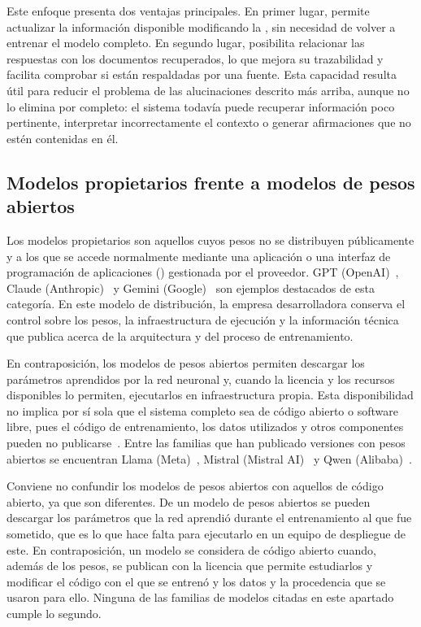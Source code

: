 Este enfoque presenta dos ventajas principales. En primer lugar, permite actualizar la información disponible modificando la , sin necesidad de volver a entrenar el modelo completo. En segundo lugar, posibilita relacionar las respuestas con los documentos recuperados, lo que mejora su trazabilidad y facilita comprobar si están respaldadas por una fuente. Esta capacidad resulta útil para reducir el problema de las alucinaciones descrito más arriba, aunque no lo elimina por completo: el sistema todavía puede recuperar información poco pertinente, interpretar incorrectamente el contexto o generar afirmaciones que no estén contenidas en él.

\subsection{Modelos propietarios frente a modelos de pesos abiertos}
\label{subsec:propietarios_abiertos}

Los modelos propietarios son aquellos cuyos pesos no se distribuyen públicamente y a los que se accede normalmente mediante una aplicación o una interfaz de programación de aplicaciones () gestionada por el proveedor. GPT (OpenAI)~\cite{openai_api2020}, Claude (Anthropic)~\cite{anthropic_claude2026} y Gemini (Google)~\cite{google_gemini2026} son ejemplos destacados de esta categoría. En este modelo de distribución, la empresa desarrolladora conserva el control sobre los pesos, la infraestructura de ejecución y la información técnica que publica acerca de la arquitectura y del proceso de entrenamiento.

En contraposición, los modelos de pesos abiertos permiten descargar los parámetros aprendidos por la red neuronal y, cuando la licencia y los recursos disponibles lo permiten, ejecutarlos en infraestructura propia. Esta disponibilidad no implica por sí sola que el sistema completo sea de código abierto o software libre, pues el código de entrenamiento, los datos utilizados y otros componentes pueden no publicarse~\cite{osi_osaid2024}. Entre las familias que han publicado versiones con pesos abiertos se encuentran Llama (Meta)~\cite{meta_llama31_license2024}, Mistral (Mistral AI)~\cite{mistral_models2026} y Qwen (Alibaba)~\cite{qwen3_2025}.

Conviene no confundir los modelos de pesos abiertos con aquellos de código abierto, ya que son diferentes. De un modelo de pesos abiertos se pueden descargar los parámetros que la red aprendió durante el entrenamiento al que fue sometido, que es lo que hace falta para ejecutarlo en un equipo de despliegue de este. En contraposición, un modelo se considera de código abierto cuando, además de los pesos, se publican con la licencia que permite estudiarlos y modificar el código con el que se entrenó y los datos y la procedencia que se usaron para ello. Ninguna de las familias de modelos citadas en este apartado cumple lo segundo.

